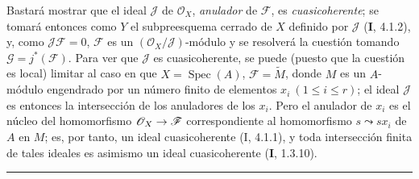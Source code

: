 \documentclass[10pt,oneside,openany]{book}
\theoremstyle{egaenv}\newtheorem*{env}{---}
\theoremstyle{egastatement}
\theoremstyle{egadescription}
\renewcommand{\leq}{\leqslant}
\renewcommand{\to}{\mathchoice{\longrightarrow}{\rightarrow}{\rightarrow}{\rightarrow}}
\begin{document}
Bastará mostrar que el ideal $\mathscr J$ de $\mathscr O_X$,
\emph{anulador} de $\mathscr F$, es \emph{cuasicoherente}; se tomará entonces
como $Y$ el subpreesquema cerrado de $X$ definido por $\mathscr J$ (\textbf I, 4.1.2),
y, como $\mathscr J\mathscr F=0$, $\mathscr F$ es un
$(\mathscr O_X/\mathscr J)$-módulo y se resolverá la cuestión tomando
$\mathscr G=j^*(\mathscr F)$. Para ver que $\mathscr J$ es cuasicoherente, se
puede (puesto que la cuestión es local) limitar al caso en que
$X=\operatorname{Spec}(A)$, $\mathscr F=\widetilde M$, donde $M$ es un
$A$-módulo engendrado por un número finito de elementos
$x_i\ (1\leq i\leq r)$; el ideal $\mathscr J$ es entonces la intersección de
los anuladores de los $x_i$. Pero el anulador de $x_i$ es el núcleo del
homomorfismo $\mathscr O_X\to\mathscr F$ correspondiente al homomorfismo
$s\leadsto sx_i$ de $A$ en $M$; es, por tanto, un ideal cuasicoherente (I,
4.1.1), y toda intersección finita de tales ideales es asimismo un ideal
cuasicoherente (\textbf I, 1.3.10).

\begin{center}\rule{25mm}{0.4pt}\end{center}
\end{document}
